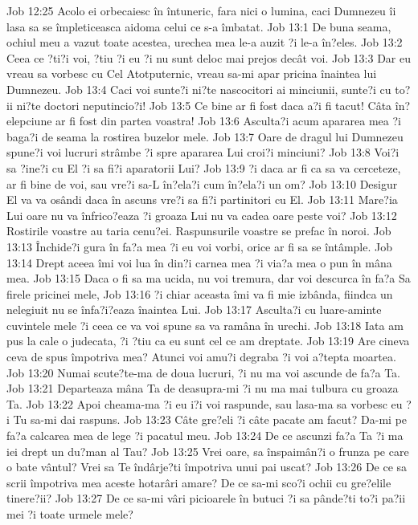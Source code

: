 Job 12:25  Acolo ei orbecaiesc în întuneric, fara nici o lumina, caci Dumnezeu îi lasa sa se împleticeasca aidoma celui ce s-a îmbatat.
Job 13:1  De buna seama, ochiul meu a vazut toate acestea, urechea mea le-a auzit ?i le-a în?eles.
Job 13:2  Ceea ce ?ti?i voi, ?tiu ?i eu ?i nu sunt deloc mai prejos decât voi.
Job 13:3  Dar eu vreau sa vorbesc cu Cel Atotputernic, vreau sa-mi apar pricina înaintea lui Dumnezeu.
Job 13:4  Caci voi sunte?i ni?te nascocitori ai minciunii, sunte?i cu to?ii ni?te doctori neputincio?i!
Job 13:5  Ce bine ar fi fost daca a?i fi tacut! Câta în?elepciune ar fi fost din partea voastra!
Job 13:6  Asculta?i acum apararea mea ?i baga?i de seama la rostirea buzelor mele.
Job 13:7  Oare de dragul lui Dumnezeu spune?i voi lucruri strâmbe ?i spre apararea Lui croi?i minciuni?
Job 13:8  Voi?i sa ?ine?i cu El ?i sa fi?i aparatorii Lui?
Job 13:9  ?i daca ar fi ca sa va cerceteze, ar fi bine de voi, sau vre?i sa-L în?ela?i cum în?ela?i un om?
Job 13:10  Desigur El va va osândi daca în ascuns vre?i sa fi?i partinitori cu El.
Job 13:11  Mare?ia Lui oare nu va înfrico?eaza ?i groaza Lui nu va cadea oare peste voi?
Job 13:12  Rostirile voastre au taria cenu?ei. Raspunsurile voastre se prefac în noroi.
Job 13:13  Închide?i gura în fa?a mea ?i eu voi vorbi, orice ar fi sa se întâmple.
Job 13:14  Drept aceea îmi voi lua în din?i carnea mea ?i via?a mea o pun în mâna mea.
Job 13:15  Daca o fi sa ma ucida, nu voi tremura, dar voi descurca în fa?a Sa firele pricinei mele,
Job 13:16  ?i chiar aceasta îmi va fi mie izbânda, fiindca un nelegiuit nu se înfa?i?eaza înaintea Lui.
Job 13:17  Asculta?i cu luare-aminte cuvintele mele ?i ceea ce va voi spune sa va ramâna în urechi.
Job 13:18  Iata am pus la cale o judecata, ?i ?tiu ca eu sunt cel ce am dreptate.
Job 13:19  Are cineva ceva de spus împotriva mea? Atunci voi amu?i degraba ?i voi a?tepta moartea.
Job 13:20  Numai scute?te-ma de doua lucruri, ?i nu ma voi ascunde de fa?a Ta.
Job 13:21  Departeaza mâna Ta de deasupra-mi ?i nu ma mai tulbura cu groaza Ta.
Job 13:22  Apoi cheama-ma ?i eu i?i voi raspunde, sau lasa-ma sa vorbesc eu ?i Tu sa-mi dai raspuns.
Job 13:23  Câte gre?eli ?i câte pacate am facut? Da-mi pe fa?a calcarea mea de lege ?i pacatul meu.
Job 13:24  De ce ascunzi fa?a Ta ?i ma iei drept un du?man al Tau?
Job 13:25  Vrei oare, sa înspaimân?i o frunza pe care o bate vântul? Vrei sa Te îndârje?ti împotriva unui pai uscat?
Job 13:26  De ce sa scrii împotriva mea aceste hotarâri amare? De ce sa-mi sco?i ochii cu gre?elile tinere?ii?
Job 13:27  De ce sa-mi vâri picioarele în butuci ?i sa pânde?ti to?i pa?ii mei ?i toate urmele mele?
